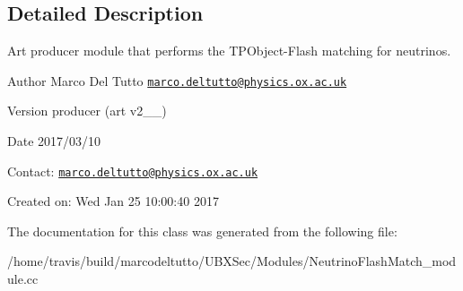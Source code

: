 \subsection{Detailed Description}
Art producer module that performs the T\-P\-Object-\/\-Flash matching for neutrinos. 

\begin{DoxyAuthor}{Author}
Marco Del Tutto \href{mailto:marco.deltutto@physics.ox.ac.uk}{\tt marco.\-deltutto@physics.\-ox.\-ac.\-uk}
\end{DoxyAuthor}
\begin{DoxyVersion}{Version}
producer (art v2\-\_\-\_)
\end{DoxyVersion}
\begin{DoxyDate}{Date}
2017/03/10
\end{DoxyDate}
Contact\-: \href{mailto:marco.deltutto@physics.ox.ac.uk}{\tt marco.\-deltutto@physics.\-ox.\-ac.\-uk}

Created on\-: Wed Jan 25 10\-:00\-:40 2017 

The documentation for this class was generated from the following file\-:\begin{DoxyCompactItemize}
\item 
/home/travis/build/marcodeltutto/\-U\-B\-X\-Sec/\-Modules/Neutrino\-Flash\-Match\-\_\-module.\-cc\end{DoxyCompactItemize}

